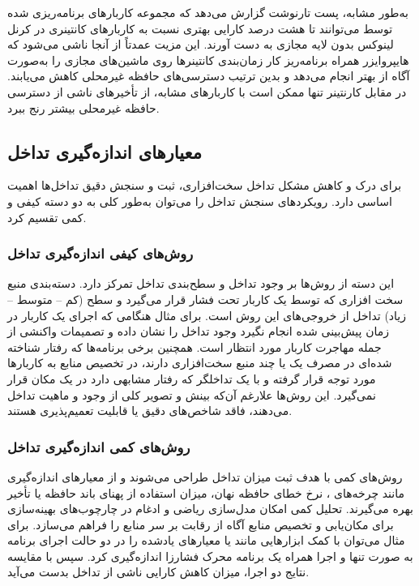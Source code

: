 به‌طور مشابه، پست تارنوشت  گزارش می‌دهد\cite{vmware2019vSphere} که مجموعه کاربارهای برنامه‌ریزی شده توسط  می‌توانند تا هشت درصد کارایی بهتری نسبت به کاربارهای کانتینری در کرنل لینوکس بدون لایه مجازی به دست آورند. این مزیت عمدتاً از آنجا ناشی می‌شود که هایپروایزر  همراه برنامه‌ریز  کار زمان‌بندی کانتینرها روی ماشین‌های مجازی را به‌صورت آگاه از  بهتر انجام می‌دهد و بدین ترتیب دسترسی‌های حافظه غیرمحلی کاهش می‌یابند. در مقابل کارنتینر تنها ممکن است با کاربارهای مشابه، از تأخیرهای ناشی از دسترسی حافظه غیرمحلی بیشتر رنج ببرد.

\subsection{معیارهای اندازه‌گیری تداخل}

برای درک و کاهش مشکل تداخل سخت‌افزاری، ثبت و سنجش دقیق تداخل‌ها اهمیت اساسی دارد. رویکردهای سنجش تداخل را می‌توان به‌طور کلی به دو دسته کیفی و کمی تقسیم کرد.

\subsubsection{روش‌های کیفی اندازه‌گیری تداخل}

این دسته از روش‌ها بر وجود تداخل و سطح‌بندی تداخل تمرکز دارد. دسته‌بندی منبع سخت افزاری که توسط یک کاربار تحت فشار قرار می‌گیرد و سطح (کم – متوسط – زیاد) تداخل از خروجی‌های این روش است. برای مثال هنگامی که اجرای یک کاربار در زمان پیش‌بینی شده انجام نگیرد وجود تداخل را نشان داده و تصمیمات واکنشی از جمله مهاجرت کاربار مورد انتظار است. همچنین برخی برنامه‌ها که رفتار شناخته شده‌ای در مصرف یک یا چند منبع سخت‌افزاری دارند، در تخصیص منابع به کاربارها مورد توجه قرار گرفته و با یک تداخلگر که رفتار مشابهی دارد در یک مکان قرار نمی‌گیرد. این روش‌ها علارغم آن‌که بینش و تصویر کلی از وجود و ماهیت تداخل می‌دهند،‌ فاقد شاخص‌های دقیق یا قابلیت تعمیم‌پذیری هستند.

\subsubsection{روش‌های کمی اندازه‌گیری تداخل}

روش‌های کمی با هدف ثبت میزان تداخل طراحی می‌شوند و از معیارهای اندازه‌گیری مانند چرخه‌های ، نرخ خطای حافظه نهان، میزان استفاده از پهنای باند حافظه یا تأخیر  بهره می‌گیرند. تحلیل کمی امکان مدل‌سازی ریاضی و ادغام در چارچوب‌های بهینه‌سازی برای مکان‌یابی و تخصیص منابع آگاه از رقابت بر سر منابع را فراهم می‌سازد. برای مثال می‌توان با کمک ابزارهایی مانند  یا  معیارهای یادشده را در دو حالت اجرای برنامه به صورت تنها و اجرا همراه یک برنامه محرک فشارزا اندازه‌گیری کرد. سپس با مقایسه نتایج دو اجرا، میزان کاهش کارایی ناشی از تداخل بدست می‌آید.

